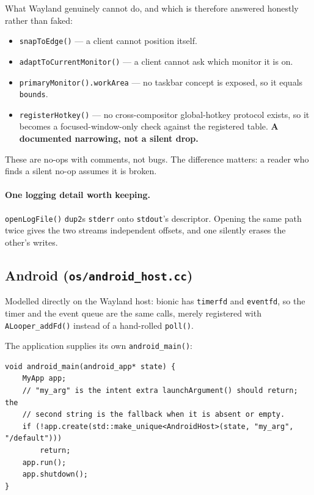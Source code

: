 \documentclass[11pt,a4paper]{article}
\begin{document}
What Wayland genuinely cannot do, and which is therefore answered honestly
rather than faked:

\begin{itemize}[leftmargin=*]
\item \texttt{snapToEdge()} --- a client cannot position itself.
\item \texttt{adaptToCurrentMonitor()} --- a client cannot ask which monitor it
  is on.
\item \texttt{primaryMonitor().workArea} --- no taskbar concept is exposed, so
  it equals \texttt{bounds}.
\item \texttt{registerHotkey()} --- no cross-compositor global-hotkey protocol
  exists, so it becomes a focused-window-only check against the registered
  table. \textbf{A documented narrowing, not a silent drop.}
\end{itemize}

These are no-ops with comments, not bugs. The difference matters: a reader who
finds a silent no-op assumes it is broken.

\paragraph{One logging detail worth keeping.} \texttt{openLogFile()}
\texttt{dup2}s \texttt{stderr} onto \texttt{stdout}'s descriptor. Opening the
same path twice gives the two streams independent offsets, and one silently
erases the other's writes.

\subsection{Android (\texttt{os/android\_host.cc})}
\label{sec:android}

Modelled directly on the Wayland host: bionic has \texttt{timerfd} and
\texttt{eventfd}, so the timer and the event queue are the same calls, merely
registered with \texttt{ALooper\_addFd()} instead of a hand-rolled
\texttt{poll()}.

The application supplies its own \texttt{android\_main()}:

\begin{lstlisting}
void android_main(android_app* state) {
    MyApp app;
    // "my_arg" is the intent extra launchArgument() should return; the
    // second string is the fallback when it is absent or empty.
    if (!app.create(std::make_unique<AndroidHost>(state, "my_arg", "/default")))
        return;
    app.run();
    app.shutdown();
}
\end{lstlisting}
\end{document}
